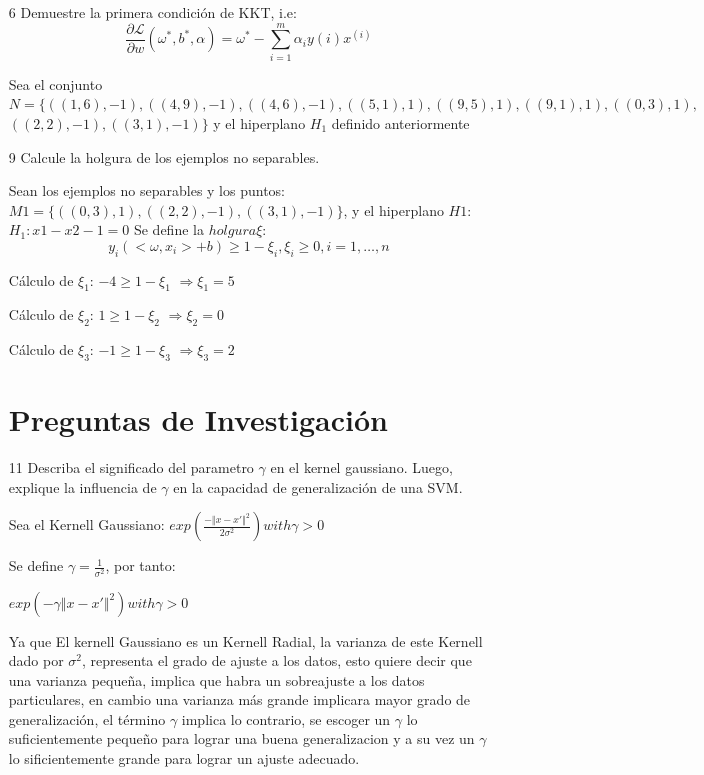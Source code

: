 \documentclass{article}
\begin{document}
\begin{itemize}
    \item [6] Demuestre la primera condición de \textnormal{KKT}, i.e: 
    \[
        \frac{\partial \mathcal{L}}{\partial w} (\omega^*, b^*, \alpha)= \omega^* - \sum_{i=1}^m \alpha_i y(i)x^{(i)}    
    \]
    
Sea el conjunto $N = \{((1, 6), -1), ((4, 9), -1),((4, 6), -1), ((5, 1), 1), ((9,5), 1), ((9,1), 1), ((0, 3), 1),$ \newline
$((2,2),-1), ((3,1),-1)\}$ y el
hiperplano $H_1$ definido anteriormente


    \item [9] Calcule la holgura de los ejemplos no separables.

    Sean los ejemplos no separables y los puntos: $M1 = \{((0, 3), 1), ((2,2),-1), ((3,1),-1)\}$, y el hiperplano $H1$: $H_1: x1 - x2 - 1 = 0$
    Se define la $holgura \xi$:
    \[
        y_i(<\omega, x_i> + b) \geq 1 - \xi_i, \xi_i \geq 0, i = 1,\dots, n    
    \]

    Cálculo de $\xi_1$: $-4 \geq 1 - \xi_1$ $\Rightarrow \xi_1 = 5$

    Cálculo de $\xi_2$: $1 \geq 1 - \xi_2$ $\Rightarrow \xi_2 = 0$

    Cálculo de $\xi_3$: $-1 \geq 1 - \xi_3$ $\Rightarrow \xi_3 = 2$ 


    \section{Preguntas de Investigación}

    \item [11] Describa el significado del parametro $\gamma$ en el kernel gaussiano. Luego, explique la influencia de $\gamma$ en la
    capacidad de generalización de una SVM.

    Sea el Kernell Gaussiano: $exp( \frac{- \Vert x - x' \Vert^2}{2\sigma^2}) with \gamma > 0$
    
    Se define $\gamma = \frac{1}{\sigma^2}$, por tanto: 

    $exp(-\gamma \Vert x - x' \Vert^2) with \gamma > 0$

    Ya que El kernell Gaussiano es un Kernell Radial, la varianza de este Kernell dado por $\sigma^2$, 
    representa el grado de ajuste a los datos, esto quiere decir que una varianza pequeña, implica que
    habra un sobreajuste a los datos particulares, en cambio una varianza más grande implicara mayor 
    grado de generalización, el término $\gamma$ implica lo contrario, se escoger un $\gamma$ lo suficientemente
    pequeño para lograr una buena generalizacion y a su vez un $\gamma$ lo sificientemente grande para lograr
    un ajuste adecuado.


\end{itemize}
\end{document}
